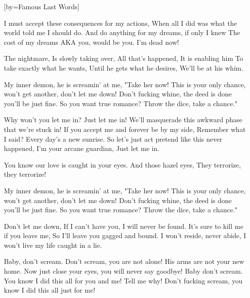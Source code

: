  

[by=Famous Last Words]




\beginverse
I must accept these consequences for my actions,
When all I did was what the world told me I should do.
And do anything for my dreams, if only I knew
The cost of my dreams AKA you, would be you.
I'm dead now!
\endverse

\beginchorus
The nightmare,   \brk   Is slowly taking over,
All that's happened,   \brk   It is enabling him
To take exactly what he wants,   \brk   Until he gets what he desires,
We'll be at his whim.
\endchorus

\beginchorus
My inner demon, he is screamin' at me, "Take her now!
This is your only chance, won't get another, don't let me down!
Don't fucking whine, the deed is done you'll be just fine.
So you want true romance? Throw the dice, take a chance."
\endchorus

\beginverse
Why won't you let me in? Just let me in!
We'll masquerade this awkward phase that we're stuck in!
If you accept me and forever be by my side,
Remember what I said? Every day's a new sunrise.
So let's just act pretend like this never happened,
I'm your arcane guardian,
Just let me in.
\endverse

\beginchorus
You know our love is caught in your eyes.
And those hazel eyes,  \brk  They terrorize, they terrorize!
\endchorus

\beginchorus
My inner demon, he is screamin' at me, "Take her now!
This is your only chance, won't get another, don't let me down!
Don't fucking whine, the deed is done you'll be just fine.
So you want true romance? Throw the dice, take a chance."
\endchorus

\beginchorus
Don't let me down,   \brk   If I can't have you, I will never be found.
It's sure to kill me if you leave me,  \brk  So I'll leave you gagged and bound.
I won't reside, never abide,
I won't live my life caught in a lie.
\endchorus

\beginverse
Baby, don't scream.
Don't scream, you are not alone!
His arms are not your new home.
Now just close your eyes, you will never say goodbye!
Baby don't scream.
You know I did this all for you and me!
Tell me why!
Don't fucking scream, you know I did this all just for me!
\endverse

